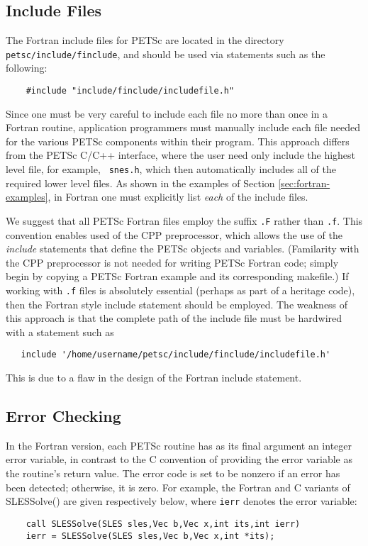 \subsection{Include Files}

The Fortran include files for PETSc are located in the directory 
{\tt petsc/include/finclude}, and should be used via statements such as
the following:
\begin{verbatim}
    #include "include/finclude/includefile.h"
\end{verbatim}
Since one must be very careful to include each file no more than once
in a Fortran routine, application programmers must manually include
each file needed for the various PETSc components within their
program.  This approach differs from the PETSc C/C++ interface, where
the user need only include the highest level file, for example, {\tt
snes.h}, which then automatically includes all of the required lower
level files.  As shown in the examples of Section
\ref{sec:fortran-examples}, in Fortran one must explicitly list {\em
each} of the include files.

We suggest that all PETSc Fortran files employ the suffix {\tt .F}
rather than {\tt .f}.  This convention enables used of the CPP
preprocessor, which allows the use of the {\em include} statements
that define the PETSc objects and variables. (Familarity with the CPP
preprocessor is not needed for writing PETSc Fortran code; simply
begin by copying a PETSc Fortran example and its corresponding
makefile.)  If working with {\tt .f} files is absolutely essential
(perhaps as part of a heritage code), then the Fortran style include
statement should be employed.  The weakness of this approach is that
the complete path of the include file must be hardwired with a 
statement such as
\begin{verbatim}
   include '/home/username/petsc/include/finclude/includefile.h'
\end{verbatim}
This is due to a flaw in the design of the Fortran include statement.

\subsection{Error Checking}
\label{sec:fortran_errors}

In the Fortran version, each PETSc routine has as its final argument
an integer error variable, in contrast to the C convention of
providing the error variable as the routine's return value.  The error
code is set to be nonzero if an error has been detected; otherwise, it
is zero.  For example, the Fortran and C variants of {SLESSolve()} are
given respectively below, where {\tt ierr} denotes the error variable:
\begin{verbatim}
    call SLESSolve(SLES sles,Vec b,Vec x,int its,int ierr)
    ierr = SLESSolve(SLES sles,Vec b,Vec x,int *its);
\end{verbatim}

